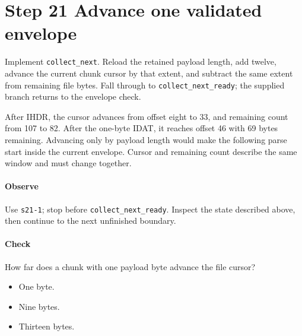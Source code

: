 \section{Step 21 Advance one validated envelope}\label{png-collect-s21}
Implement \texttt{collect\_next}. Reload the retained payload length, add twelve, advance the current chunk cursor by that extent, and subtract the same extent from remaining file bytes. Fall through to \texttt{collect\_next\_ready}; the supplied branch returns to the envelope check.

After IHDR, the cursor advances from offset eight to 33, and remaining count from 107 to 82. After the one-byte IDAT, it reaches offset 46 with 69 bytes remaining. Advancing only by payload length would make the following parse start inside the current envelope. Cursor and remaining count describe the same window and must change together.

\paragraph{Observe} Use \texttt{s21-1}; stop before \texttt{collect\_next\_ready}. Inspect the state described above, then continue to the next unfinished boundary.

\paragraph{Check} How far does a chunk with one payload byte advance the file cursor?
\begin{itemize}
  \item[A.] One byte.
  \item[B.] Nine bytes.
  \item[C.] Thirteen bytes.
\end{itemize}
